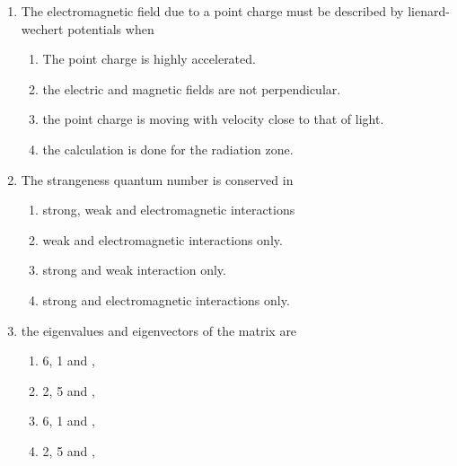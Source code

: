 \documentclass[journal,12pt,onecolumn]{IEEEtran}
\begin{document}
\begin{enumerate}[itemsep = 1em]
\item The electromagnetic field due to a point charge must be described by lienard-wechert potentials when

\hfill{}

\begin{enumerate}
    \item The point charge is highly accelerated.
    \item the electric and magnetic fields are not perpendicular.
    \item the point charge is moving with velocity close to that of light.
    \item the calculation is done for the radiation zone.
\end{enumerate}


\item The strangeness quantum number is conserved in

\hfill{}

\begin{enumerate}
    \item strong, weak and electromagnetic interactions
    \item weak and electromagnetic interactions only.
    \item strong and weak interaction only.
    \item strong and electromagnetic interactions only.
\end{enumerate}


\item the eigenvalues and eigenvectors of the matrix  are 

\hfill{}

\begin{multicols}{2}
\begin{enumerate}
    \item 6, 1 and ,
    \item 2, 5 and ,
    \item 6, 1 and ,
    \item 2, 5 and ,
    \end{enumerate}
\end{multicols}



\end{enumerate}
\end{document}
